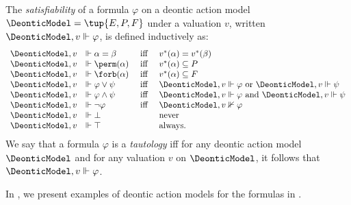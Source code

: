 The \emph{satisfiability} of a formula $\varphi$ on a deontic action model $\DeonticModel = \tup{E, P, F}$ under a
valuation $v$, written ${\DeonticModel, v} \Vdash \varphi$, is
defined inductively as:
\[
\begin{array}{rlcl}
   \DeonticModel, v & \Vdash \alpha=\beta
       & \mathrel{\mbox{ iff }} & 	v^{*}(\alpha) = v^{*}(\beta) \\
   \DeonticModel, v & \Vdash \perm(\alpha)
       & \mathrel{\mbox{ iff }} & v^{*}(\alpha) \subseteq P\\
   \DeonticModel, v & \Vdash \forb(\alpha)
       & \mathrel{\mbox{ iff }} & v^{*}(\alpha) \subseteq F\\
   \DeonticModel, v & \Vdash \varphi \lor \psi
       & \mathrel{\mbox{ iff }} & \DeonticModel, v \Vdash \varphi
         \mbox{ or }      \DeonticModel, v \Vdash \psi\\
   \DeonticModel, v & \Vdash \varphi \land \psi
       & \mathrel{\mbox{ iff }} & \DeonticModel, v \Vdash \varphi
       \mbox{ and } \DeonticModel, v \Vdash \psi\\
   \DeonticModel, v & \Vdash \lnot \varphi
       & \mathrel{\mbox{ iff }} & \DeonticModel, v \nVdash \varphi\\
   \DeonticModel, v & \Vdash \bot
      &  & \mbox{never}\\
   \DeonticModel, v & \Vdash \top
      &  & \mbox{always.}\\
\end{array}
\]
We say that a formula $\varphi$ is a \emph{tautology} iff for any deontic action model $\DeonticModel$ and for any valuation $v$ on $\DeonticModel$, it follows that ${\DeonticModel, v} \Vdash \varphi$.

In , we present examples of deontic action models for the formulas in .

\medskip 


